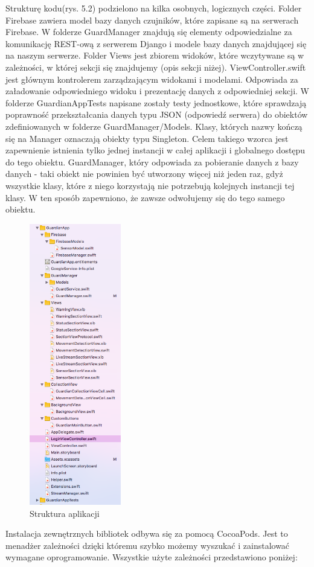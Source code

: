 Strukturę kodu(rys. 5.2) podzielono na kilka osobnych, logicznych części. Folder Firebase zawiera model bazy danych czujników, które zapisane są na serwerach Firebase. W folderze GuardManager znajdują się elementy odpowiedzialne za komunikację REST-ową z serwerem Django i modele bazy danych znajdującej się na naszym serwerze. Folder Views jest zbiorem widoków, które wczytywane są w zależności, w której sekcji się znajdujemy (opis sekcji niżej). ViewController.swift jest głównym kontrolerem zarządzającym widokami i modelami. Odpowiada za załadowanie odpowiedniego widoku i prezentację danych z odpowiedniej sekcji. W folderze GuardianAppTests napisane zostały testy jednostkowe, które sprawdzają poprawność przekształcania danych typu JSON (odpowiedź serwera) do obiektów zdefiniowanych w folderze GuardManager/Models. Klasy, których nazwy kończą się na Manager oznaczają obiekty typu Singleton. Celem takiego wzorca jest zapewnienie istnienia tylko jednej instancji w całej aplikacji i globalnego dostępu do tego obiektu. GuardManager, który odpowiada za pobieranie danych z bazy danych - taki obiekt nie powinien być utworzony więcej niż jeden raz, gdyż wszystkie klasy, które z niego korzystają nie potrzebują kolejnych instancji tej klasy. W ten sposób zapewniono, że zawsze odwołujemy się do tego samego obiektu.
\begin{figure}[h]
	\centering
	\includegraphics[width=4cm]{iOSstructure}
	\caption{Struktura aplikacji}
\end{figure}
Instalacja zewnętrznych bibliotek odbywa się za pomocą CocoaPods. Jest to menadżer zależności dzięki któremu szybko możemy wyszukać i zainstalować wymagane oprogramowanie. Wszystkie użyte zależności przedstawiono poniżej: 

